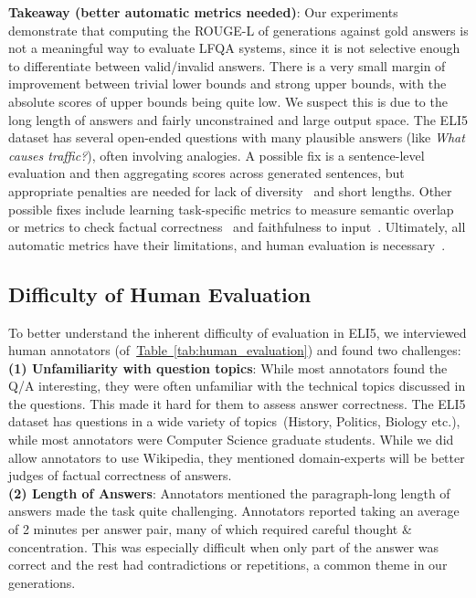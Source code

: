 \documentclass[11pt]{article}
\newcommand{\namedref}[2]{\hyperref[#2]{#1~\ref*{#2}}}
\newcommand{\tableref}[1]{\namedref{Table}{#1}}
\begin{document}
\noindent \textbf{Takeaway (better automatic metrics needed)}: Our experiments demonstrate that computing the ROUGE-L of generations against gold answers is not a meaningful way to evaluate LFQA systems, since it is not selective enough to differentiate between valid/invalid answers. There is a very small margin of improvement between trivial lower bounds and strong upper bounds, with the absolute scores of upper bounds being quite low. We suspect this is due to the long length of answers and fairly unconstrained and large output space. The ELI5 dataset has several open-ended questions with many plausible answers (like \emph{What causes traffic?}), often involving analogies. A possible fix is a sentence-level evaluation and then aggregating scores across generated sentences, but appropriate penalties are needed for lack of diversity~\citep{zhu2018texygen} and short lengths. Other possible fixes include learning task-specific metrics to measure semantic overlap~\citep{sellam2020bleurt} or metrics to check factual correctness~\citep{zhang2019optimizing} and faithfulness to input~\citep{wang2020asking, durmus2020feqa, zhou2020detecting}. Ultimately, all automatic metrics have their limitations, and human evaluation is necessary~\citep{celikyilmaz2020evaluation}.

\subsection{Difficulty of Human Evaluation}
\label{sec:human_eval_difficulty}

To better understand the inherent difficulty of evaluation in ELI5, we interviewed human annotators (of~\tableref{tab:human_evaluation}) and found two challenges:\\



\noindent \textbf{(1) Unfamiliarity with question topics}: While most annotators found the Q/A interesting, they were often unfamiliar with the technical topics discussed in the questions. This made it hard for them to assess answer correctness. The ELI5 dataset has questions in a wide variety of topics~(History, Politics, Biology etc.), while most annotators were Computer Science graduate students. While we did allow annotators to use Wikipedia, they mentioned domain-experts will be better judges of factual correctness of answers.\\

\noindent \textbf{(2) Length of Answers}: Annotators mentioned the paragraph-long length of answers made the task quite challenging. Annotators reported taking an average of 2 minutes per answer pair, many of which required careful thought \& concentration. This was especially difficult when only part of the answer was correct and the rest had contradictions or repetitions, a common theme in our generations.\\
\end{document}
